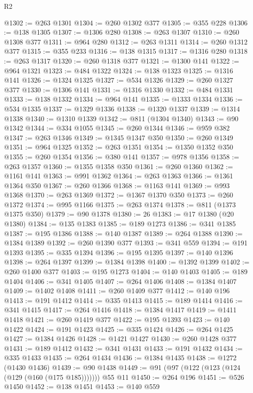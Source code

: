 \begin{lexlean}{R2}
\begin{coremodule}
@1302 := @263 @1301
@1304 := @260 @1302 @377
@1305 := @355 @228
@1306 := @138 @1305
@1307 := @1306 @280
@1308 := @263 @1307
@1310 := @260 @1308 @377
@1311 := @964 @280
@1312 := @263 @1311
@1314 := @260 @1312 @377
@1315 := @355 @233
@1316 := @138 @1315
@1317 := @1316 @280
@1318 := @263 @1317
@1320 := @260 @1318 @377
@1321 := @1300 @141
@1322 := @964 @1321
@1323 := @484 @1322
@1324 := @138 @1323
@1325 := @1316 @141
@1326 := @1324 @1325
@1327 := @534 @1326
@1329 := @260 @1327 @377
@1330 := @1306 @141
@1331 := @1316 @1330
@1332 := @484 @1331
@1333 := @138 @1332
@1334 := @964 @141
@1335 := @1333 @1334
@1336 := @534 @1335
@1337 := @1329 @1336
@1338 := @1320 @1337
@1339 := @1314 @1338
@1340 := @1310 @1339
@1342 := @811 (@1304 @1340)
@1343 := @90 @1342
@1344 := @334 @1055
@1345 := @260 @1344
@1346 := @959 @382
@1347 := @263 @1346
@1349 := @1345 @1347 @350
@1350 := @260 @1349
@1351 := @964 @1325
@1352 := @263 @1351
@1354 := @1350 @1352 @350
@1355 := @260 @1354
@1356 := @380 @141
@1357 := @978 @1356
@1358 := @263 @1357
@1360 := @1355 @1358 @350
@1361 := @260 @1360
@1362 := @1161 @141
@1363 := @991 @1362
@1364 := @263 @1363
@1366 := @1361 @1364 @350
@1367 := @260 @1366
@1368 := @1163 @141
@1369 := @993 @1368
@1370 := @263 @1369
@1372 := @1367 @1370 @350
@1373 := @260 @1372
@1374 := @995 @1166
@1375 := @263 @1374
@1378 := @811 (@1373 @1375 @350)
@1379 := @90 @1378
@1380 := 26
@1383 := @17 @1380 (@20 @1380)
@1384 := @135 @1383
@1385 := @189 @1273
@1386 := @341 @1385
@1387 := @195 @1386
@1388 := @140 @1387
@1389 := @264 @1388
@1390 := @1384 @1389
@1392 := @260 @1390 @377
@1393 := @341 @559
@1394 := @191 @1393
@1395 := @335 @1394
@1396 := @195 @1395
@1397 := @140 @1396
@1398 := @264 @1397
@1399 := @1384 @1398
@1400 := @1392 @1399
@1402 := @260 @1400 @377
@1403 := @195 @1273
@1404 := @140 @1403
@1405 := @189 @1404
@1406 := @341 @1405
@1407 := @264 @1406
@1408 := @1384 @1407
@1409 := @1402 @1408
@1411 := @260 @1409 @377
@1412 := @140 @196
@1413 := @191 @1412
@1414 := @335 @1413
@1415 := @189 @1414
@1416 := @341 @1415
@1417 := @264 @1416
@1418 := @1384 @1417
@1419 := @1411 @1418
@1421 := @260 @1419 @377
@1422 := @195 @1393
@1423 := @140 @1422
@1424 := @191 @1423
@1425 := @335 @1424
@1426 := @264 @1425
@1427 := @1384 @1426
@1428 := @1421 @1427
@1430 := @260 @1428 @377
@1431 := @189 @1412
@1432 := @341 @1431
@1433 := @191 @1432
@1434 := @335 @1433
@1435 := @264 @1434
@1436 := @1384 @1435
@1438 := @1272 (@1430 @1436)
@1439 := @90 @1438
@1449 := @91 (@97 (@122 (@123 (@124 (@129 (@160 (@175 @185))))))) @55 @11
@1450 := @264 @196
@1451 := @526 @1450
@1452 := @138 @1451
@1453 := @140 @559

\end{coremodule}
\end{lexlean}
